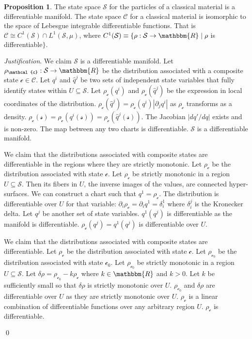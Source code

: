 \documentclass[aps,pra,10pt,twocolumn,floatfix,nofootinbib]{revtex4-1}
\numberwithin{equation}{section}
\theoremstyle{definition}
\newtheorem{prop}[equation]{Proposition}
\newenvironment{justification}{\emph{Justification}.}{\qed}
\begin{document}
\begin{prop}\label{prop:differentiable_manifold}
	The state space $\mathcal{S}$ for the particles of a  classical material is a differentiable manifold. The state space $\mathcal{C}$ for a classical material is isomorphic to the space of Lebesgue integrable differentiable functions. That is $\mathcal{C} \cong C^1(\mathcal{S}) \cap L^1(\mathcal{S}, \mu)$, where $C^1(\mathcal{S}) \equiv \{\rho:\mathcal{S} \rightarrow \mathbbm{R} \; | \; \rho$ is differentiable$\}$.
\end{prop}
\begin{justification}
	We claim $\mathcal{S}$ is a differentiable manifold. Let $\rho_\mathcal{c} : \mathcal{S} \rightarrow \mathbbm{R}$ be the distribution associated with a composite state $\mathcal{c} \in \mathcal{C}$. Let $q^i$ and $\hat{q}^j$ be two sets of independent state variables that fully identify states within $U\subseteq \mathcal{S}$. Let $\rho_\mathcal{c}(q^i)$ and $\rho_\mathcal{c}(\hat{q}^j)$ be the expression in local coordinates of the distribution.  $\rho_\mathcal{c}(\hat{q}^j)=\rho_\mathcal{c}(q^i) | \partial_j q^i |$ as $\rho_\mathcal{c}$ transforms as a density. $\rho_\mathcal{c}(\mathcal{s}) = \rho_\mathcal{c}(q^i(\mathcal{s})) = \rho_\mathcal{c}(\hat{q}^j(\mathcal{s}))$. The Jacobian $| d q' / d q |$ exists and is non-zero. The map between any two charts is differentiable. $\mathcal{S}$ is a differentiable manifold.
	
	We claim that the distributions associated with composite states are differentiable in the regions where they are strictly monotonic. Let $\rho_\mathcal{c}$ be the distribution associated with state $\mathcal{c}$. Let $\rho_\mathcal{c}$ be strictly monotonic in a region $U\subseteq \mathcal{S}$. Then its fibers in $U$, the inverse images of the values, are connected hyper-surfaces. We can construct a chart such that $q^1=\rho_\mathcal{c}$. The distribution is differentiable over $U$ for that variable: $\partial_{i} \rho_\mathcal{c} = \partial_{i} q^1 = \delta_i^1$ where $\delta_i^j$ is the Kronecker delta. Let $q^{j}$ be another set of state variables. $q^1(q^{j})$ is differentiable as the manifold is differentiable. $\rho_\mathcal{c}(q^{j})=q^1(q^{j})$ is differentiable over $U$.
	
	We claim that the distributions associated with composite states are differentiable. Let $\rho_\mathcal{c}$ be the distribution associated with state $\mathcal{c}$. Let $\rho_{\mathcal{c}_0}$ be the distribution associated with state $\mathcal{c}_0$. Let $\rho_{\mathcal{c}_0}$ be strictly monotonic in a region $U\subseteq \mathcal{S}$. Let $\delta \rho = \rho_{\mathcal{c}_0} - k \rho_{\mathcal{c}}$ where $k \in \mathbbm{R}$ and $k>0$. Let $k$ be sufficiently small so that $\delta \rho$ is strictly monotonic over $U$. $\rho_{\mathcal{c}_0}$ and $\delta \rho$ are differentiable over $U$ as they are strictly monotonic over $U$. $\rho_{\mathcal{c}}$ is a linear combination of differentiable functions over any arbitrary region $U$. $\rho_{\mathcal{c}}$ is differentiable.
	

\end{justification}
\end{document}
